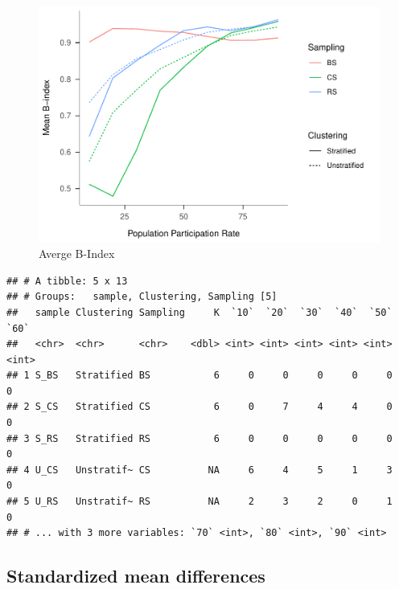 \documentclass[man,floatsintext]{apa6}
\begin{document}
\begin{figure}
\centering
\includegraphics{Results_files/figure-latex/unnamed-chunk-8-1.pdf}
\caption{\label{fig:unnamed-chunk-8}Averge B-Index}
\end{figure}

\begin{verbatim}
## # A tibble: 5 x 13
## # Groups:   sample, Clustering, Sampling [5]
##   sample Clustering Sampling     K  `10`  `20`  `30`  `40`  `50`  `60`
##   <chr>  <chr>      <chr>    <dbl> <int> <int> <int> <int> <int> <int>
## 1 S_BS   Stratified BS           6     0     0     0     0     0     0
## 2 S_CS   Stratified CS           6     0     7     4     4     0     0
## 3 S_RS   Stratified RS           6     0     0     0     0     0     0
## 4 U_CS   Unstratif~ CS          NA     6     4     5     1     3     0
## 5 U_RS   Unstratif~ RS          NA     2     3     2     0     1     0
## # ... with 3 more variables: `70` <int>, `80` <int>, `90` <int>
\end{verbatim}

\hypertarget{standardized-mean-differences}{%
\subsection{Standardized mean differences}\label{standardized-mean-differences}}
\end{document}
